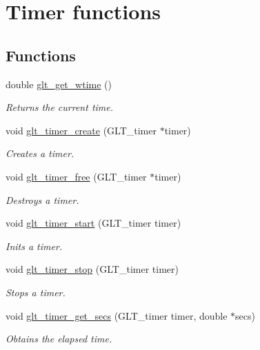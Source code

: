 \hypertarget{group__TIMER}{\section{Timer functions}
\label{group__TIMER}
}
\subsection*{Functions}
\begin{DoxyCompactItemize}
\item 
double \hyperlink{group__TIMER_ga10b6dded8a6efbfd0050a1bbb16c6093}{glt\-\_\-get\-\_\-wtime} ()
\begin{DoxyCompactList}\small\item\em Returns the current time. \end{DoxyCompactList}\item 
void \hyperlink{group__TIMER_ga1f5d36e90642bc7033e5a66aad5c3374}{glt\-\_\-timer\-\_\-create} (G\-L\-T\-\_\-timer $\ast$timer)
\begin{DoxyCompactList}\small\item\em Creates a timer. \end{DoxyCompactList}\item 
void \hyperlink{group__TIMER_ga8148126a79bc4cc7e918ce83c072beea}{glt\-\_\-timer\-\_\-free} (G\-L\-T\-\_\-timer $\ast$timer)
\begin{DoxyCompactList}\small\item\em Destroys a timer. \end{DoxyCompactList}\item 
void \hyperlink{group__TIMER_gae6d5c5474df4136fba09a44a674f2d56}{glt\-\_\-timer\-\_\-start} (G\-L\-T\-\_\-timer timer)
\begin{DoxyCompactList}\small\item\em Inits a timer. \end{DoxyCompactList}\item 
void \hyperlink{group__TIMER_ga7acf6ad2746fb5f2e4349a695832cd4f}{glt\-\_\-timer\-\_\-stop} (G\-L\-T\-\_\-timer timer)
\begin{DoxyCompactList}\small\item\em Stops a timer. \end{DoxyCompactList}\item 
void \hyperlink{group__TIMER_ga20c93b3e3ab51544bbf32116f04ab85a}{glt\-\_\-timer\-\_\-get\-\_\-secs} (G\-L\-T\-\_\-timer timer, double $\ast$secs)
\begin{DoxyCompactList}\small\item\em Obtains the elapsed time. \end{DoxyCompactList}\end{DoxyCompactItemize}


